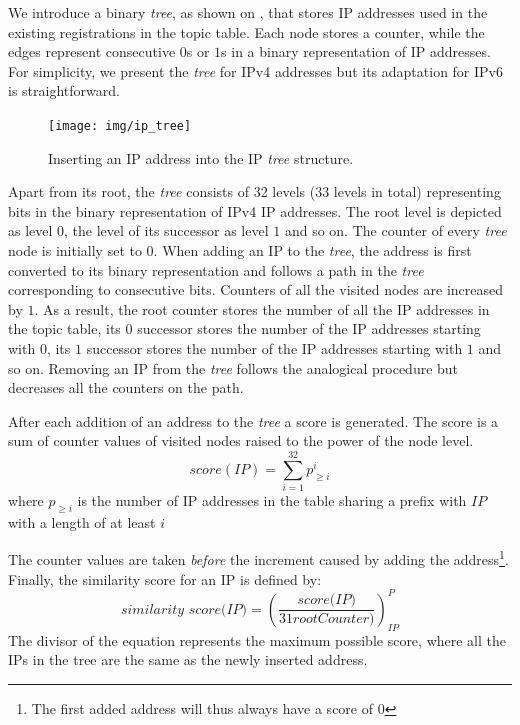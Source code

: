 We introduce a binary \emph{tree},  as shown on ,  that stores IP addresses used in the existing registrations in the topic table. 
Each node stores a counter,  while the edges represent consecutive $0$s or $1$s in a binary representation of IP addresses. 
For simplicity,  we present the \emph{tree} for IPv4 addresses but its adaptation for IPv6 is straightforward. 

\begin{figure}
    \texttt{[image: img/ip\_tree]}
    \caption{Inserting an IP address into the IP \emph{tree} structure.}
    \label{fig:ip_tree}
\end{figure}

Apart from its root,  the \emph{tree} consists of 32 levels (33 levels in total) representing bits in the binary representation of IPv4 IP addresses. 
The root level is depicted as level $0$, the level of its successor as level $1$ and so on. 
The counter of every \emph{tree} node is initially set to $0$. When adding an IP to the \emph{tree},  the address is first converted to its binary representation and follows a path in the \emph{tree} corresponding to consecutive bits. 
Counters of all the visited nodes are increased by $1$. 
As a result, the root counter stores the number of all the IP addresses in the topic table, its $0$ successor stores the number of the IP addresses starting with $0$, its $1$ successor stores the number of the IP addresses starting with $1$ and so on. 
Removing an IP from the \emph{tree} follows the analogical procedure but decreases all the counters on the path. 

After each addition of an address to the \emph{tree} a score is generated.
The score is a sum of counter values of visited nodes raised to the power of the node level. 
$$score(IP)=\sum_{i=1}^{32} p_{\geq i}^i $$
where $p_{\geq i}$ is the number of IP addresses in the table sharing a prefix with $IP$ with a length of at least $i$

The counter values are taken \emph{before} the increment caused by adding the address\footnote{The first added address will thus always have a score of $0$}. 
Finally,  the similarity score for an IP is defined by:
\begin{equation}
    \textit{similarity score(IP}) = (\frac{\textit{score(IP)}}{31\textit{rootCounter})})^P_{IP}
\end{equation}
The divisor of the equation represents the maximum possible score, where all the IPs in the tree are the same as the newly inserted address. 


